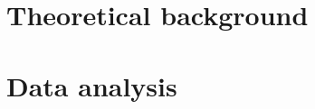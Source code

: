 \documentclass[a4paper,twoside]{book}
\begin{document}
     


\chapter{Theoretical background}


\chapter{Data analysis}



\end{document}
